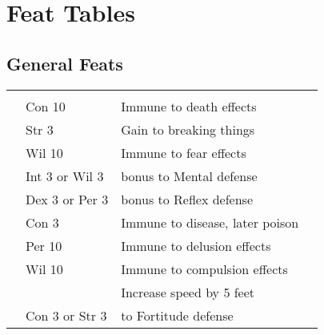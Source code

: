 \section{Feat Tables}
\onecolumn

\subsection{General Feats}
\begin{longtabuwrapper}
    \begin{longtabu}{>{\lcol}p{10em} >{\lcol}p{15em} >{\lcol}X >{\lcol}p{3em}}
         &  &  &  \\
         & Con 10 & Immune to death effects &  \\
         & Str 3 & Gain  to breaking things &  \\
         & Wil 10 & Immune to fear effects &  \\
         & Int 3 or Wil 3 &  bonus to Mental defense &  \\
         & Dex 3 or Per 3 &   bonus to Reflex defense &  \\
         & Con 3 & Immune to disease, later poison &  \\
         & Per 10 & Immune to delusion effects &  \\
         & Wil 10 & Immune to compulsion effects &  \\
         & \x & Increase speed by 5 feet &  \\
         & Con 3 or Str 3 &  to Fortitude defense &  \\


\end{longtabu}
\end{longtabuwrapper}
